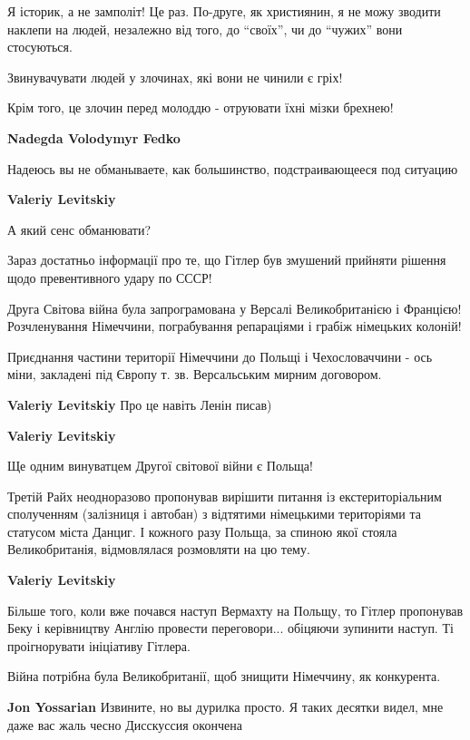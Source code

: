 \begin{itemize}
\begin{itemize}
\begin{itemize}
Я історик, а не замполіт! Це раз. По-друге, як християнин, я не можу зводити
наклепи на людей, незалежно від того, до \enquote{своїх}, чи до \enquote{чужих} вони
стосуються.

Звинувачувати людей у злочинах, які вони не чинили є гріх!

Крім того, це злочин перед молоддю - отруювати їхні мізки брехнею!

\textbf{Nadegda Volodymyr Fedko} 

Надеюсь вы не обманываете, как большинство, подстраивающееся под ситуацию

\textbf{Valeriy Levitskiy} 

А який сенс обманювати?

Зараз достатньо інформації про те, що Гітлер був змушений прийняти рішення щодо
превентивного удару по СССР!

Друга Світова війна була запрограмована у Версалі Великобританією і Францією!
Розчленування Німеччини, пограбування репараціями і грабіж німецьких колоній!

Приєднання частини території Німеччини до Польщі і Чехословаччини - ось міни,
закладені під Європу т. зв. Версальським мирним договором.


\textbf{Valeriy Levitskiy} Про це навіть Ленін писав)

\textbf{Valeriy Levitskiy} 

Ще одним винуватцем Другої світової війни є Польща!

Третій Райх неодноразово пропонував вирішити питання із екстериторіальним
сполученням (залізниця і автобан) з відтятими німецькими територіями та
статусом міста Данциг. І кожного разу Польща, за спиною якої стояла
Великобританія, відмовлялася розмовляти на цю тему.

\textbf{Valeriy Levitskiy} 

Більше того, коли вже почався наступ Вермахту на Польщу, то Гітлер пропонував
Беку і керівництву Англію провести переговори... обіцяючи зупинити наступ. Ті
проігнорувати ініціативу Гітлера.

Війна потрібна була Великобританії, щоб знищити Німеччину, як конкурента.

\end{itemize} %

\textbf{Jon Yossarian} Извините, но вы дурилка просто. Я таких десятки видел, мне даже вас жаль чесно
Дисскуссия окончена


\end{itemize}
\end{itemize}

